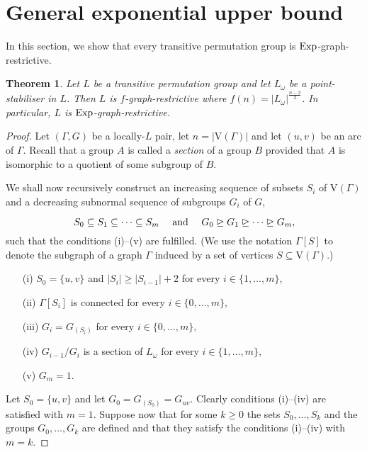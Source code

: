 \documentclass{amsart}
\newtheorem{theorem}{Theorem}
\theoremstyle{definition}
\begin{document}
\section{General exponential upper bound}
\label{Expupper}

In this section, we show that every transitive permutation group is ${\mathop{\rm Exp}}$-graph-restrictive.

\begin{theorem}
\label{the:exp}
Let $L$ be a transitive permutation group and let $L_\omega$ be a point-stabiliser in $L$. Then $L$ is $f$-graph-restrictive where $f(n) = |L_\omega|^{\frac{n-2}{2}}$. In particular, $L$ is ${\mathop{\rm Exp}}$-graph-restrictive.
\end{theorem}

\begin{proof}
Let $(\Gamma,G)$ be a locally-$L$ pair, let $n=|{\mathrm V}(\Gamma)|$ and let $(u,v)$ be an arc of $\Gamma$. Recall that a group $A$ is called a  {\em section} of a group $B$ provided that $A$ is isomorphic to a quotient of some subgroup of $B$.

We shall now recursively construct an increasing sequence of subsets $S_i$ of  ${\mathrm V}(\Gamma)$ and a decreasing subnormal sequence of subgroups $G_i$ of $G$,

\begin{equation}
\label{eq:SG}
 S_0 \subseteq S_1 \subseteq \cdots \subseteq S_m \quad \hbox{ and } \quad  G_0 \trianglerighteq G_1 \trianglerighteq \cdots \trianglerighteq G_m,
\end{equation}
such that the conditions (i)--(v) are fulfilled. (We use the notation $\Gamma[S]$ to denote the subgraph of a graph $\Gamma$ induced by a set of vertices $S \subseteq {\mathrm V}(\Gamma)$.)
\begin{itemize}
\item[{\rm (i)}]
$S_0 = \{u, v\}$ and $|S_i| \ge |S_{i-1}| + 2$ for every $i\in \{1,\ldots,m\}$,
\item[{\rm (ii)}]
$\Gamma[S_i]$ is connected for every $i\in \{0,\ldots,m\}$,
\item[{\rm (iii)}]
$G_i = G_{(S_i)}$ for every $i\in \{0,\ldots,m\}$,
\item[{\rm (iv)}]
$G_{i-1}/G_i$ is a section of $L_\omega$ for every $i\in \{1,\ldots,m\}$,
\item[{\rm (v)}]
$G_m = 1$.
\end{itemize}

Let $S_0 = \{u,v\}$ and let $G_0 =G_{(S_0)} = G_{uv}$. Clearly conditions (i)--(iv) are satisfied with $m=1$. Suppose now that for some $k\ge 0$ the sets $S_0, \ldots, S_k$ and the groups $G_0, \ldots, G_k$ are defined and that they satisfy the conditions (i)--(iv) with $m=k$.


\end{proof}
\end{document}
